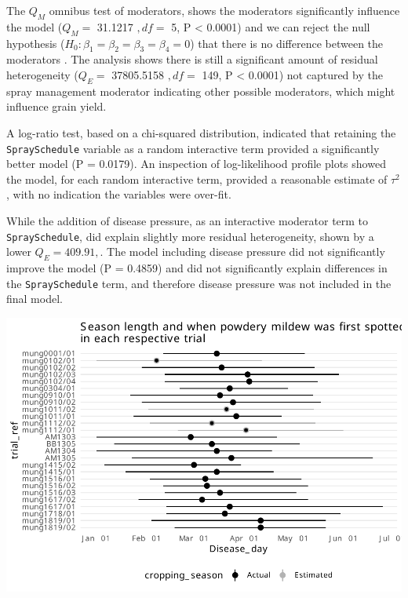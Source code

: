 \documentclass[agronomy,article,submit,moreauthors,pdftex]{mdpi}
\begin{document}
The \(Q_M\) omnibus test of moderators, shows the moderators
significantly influence the model (\(Q_M =\) 31.1217 \(,df =\) 5, P
\textless{} 0.0001) and we can reject the null hypothesis
(\(H_0 : \beta_1 = \beta_2 = \beta_3 =\beta_4 = 0\)) that there is no
difference between the moderators \citep{Viechtbauer2010}. The analysis
shows there is still a significant amount of residual heterogeneity
(\(Q_E =\) 37805.5158 \(,df=\) 149, P \textless{} 0.0001) not captured
by the spray management moderator indicating other possible moderators,
which might influence grain yield.

A log-ratio test, based on a chi-squared distribution, indicated that
retaining the \texttt{SpraySchedule} variable as a random interactive
term provided a significantly better model (P = 0.0179). An inspection
of log-likelihood profile plots showed the model, for each random
interactive term, provided a reasonable estimate of \(\tau^2\), with no
indication the variables were over-fit.

While the addition of disease pressure, as an interactive moderator term
to \texttt{SpraySchedule}, did explain slightly more residual
heterogeneity, shown by a lower \(Q_E = 409.91,\). The model including
disease pressure did not significantly improve the model (P = 0.4859)
and did not significantly explain differences in the
\texttt{SpraySchedule} term, and therefore disease pressure was not
included in the final model.

\includegraphics{paper_files/figure-latex/Figure2-1.pdf}
\end{document}
